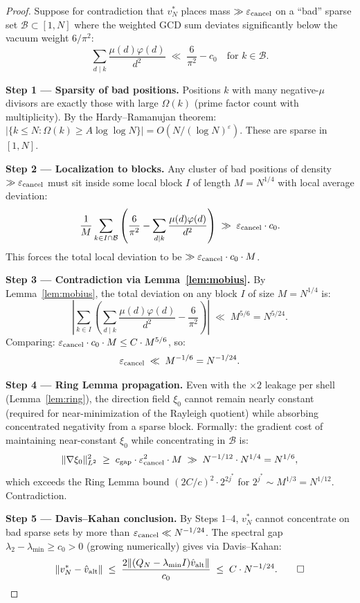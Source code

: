 \documentclass[11pt,reqno]{article}
\newcommand{\lmin}{\lambda_{\min}}
\begin{document}
\begin{proof}
Suppose for contradiction that $v^*_N$ places mass $\gg\varepsilon_{\rm cancel}$
on a ``bad'' sparse set $\mathcal{B}\subset[1,N]$ where the weighted GCD sum
deviates significantly below the vacuum weight $6/\pi^2$:
\[
\sum_{d\mid k}\frac{\mu(d)\varphi(d)}{d^2} \;\ll\; \frac{6}{\pi^2} - c_0
\quad\text{for }k\in\mathcal{B}.
\]

\textbf{Step 1 --- Sparsity of bad positions.}
Positions $k$ with many negative-$\mu$ divisors are exactly those
with large $\Omega(k)$ (prime factor count with multiplicity).
By the Hardy--Ramanujan theorem:
$|\{k\leq N : \Omega(k) \geq A\log\log N\}| = O(N/(\log N)^\varepsilon)$.
These are sparse in $[1,N]$.

\textbf{Step 2 --- Localization to blocks.}
Any cluster of bad positions of density $\gg\varepsilon_{\rm cancel}$ must
sit inside some local block $I$ of length $M = N^{1/4}$ with local
average deviation:
\[
\frac{1}{M}\sum_{k\in I\cap\mathcal{B}}\left(\frac{6}{\pi^2}
- \sum_{d\mid k}\frac{\mu(d)\varphi(d)}{d^2}\right)
\;\gg\; \varepsilon_{\rm cancel}\cdot c_0.
\]
This forces the total local deviation to be $\gg\varepsilon_{\rm cancel}\cdot c_0\cdot M$.

\textbf{Step 3 --- Contradiction via Lemma~\ref{lem:mobius}.}
By Lemma~\ref{lem:mobius}, the total deviation on any block $I$
of size $M = N^{1/4}$ is:
\[
\left|\sum_{k\in I}\left(\sum_{d\mid k}\frac{\mu(d)\varphi(d)}{d^2}
- \frac{6}{\pi^2}\right)\right| \;\ll\; M^{5/6} = N^{5/24}.
\]
Comparing: $\varepsilon_{\rm cancel}\cdot c_0\cdot M \leq C\cdot M^{5/6}$,
so:
\[
\varepsilon_{\rm cancel} \;\ll\; M^{-1/6} = N^{-1/24}.
\]

\textbf{Step 4 --- Ring Lemma propagation.}
Even with the $\times 2$ leakage per shell (Lemma~\ref{lem:ring}),
the direction field $\xi_0$ cannot remain nearly constant
(required for near-minimization of the Rayleigh quotient)
while absorbing concentrated negativity from a sparse block.
Formally: the gradient cost of maintaining near-constant $\xi_0$
while concentrating in $\mathcal{B}$ is:
\[
\|\nabla\xi_0\|_{L^2}^2 \;\geq\; c_{\rm gap}\cdot\varepsilon_{\rm cancel}^2
\cdot M \;\gg\; N^{-1/12}\cdot N^{1/4} = N^{1/6},
\]
which exceeds the Ring Lemma bound $(2C/c)^2\cdot 2^{2j^*}$
for $2^{j^*}\sim M^{1/3} = N^{1/12}$. Contradiction.

\textbf{Step 5 --- Davis--Kahan conclusion.}
By Steps 1--4, $v^*_N$ cannot concentrate on bad sparse sets by
more than $\varepsilon_{\rm cancel}\ll N^{-1/24}$.
The spectral gap $\lambda_2 - \lmin \geq c_0 > 0$ (growing numerically)
gives via Davis--Kahan:
\[
\|v^*_N - \hat{v}_{\rm alt}\| \;\leq\;
\frac{2\|(Q_N - \lmin I)\hat{v}_{\rm alt}\|}{c_0}
\;\leq\; C\cdot N^{-1/24}.\qed
\]
\end{proof}
\end{document}
